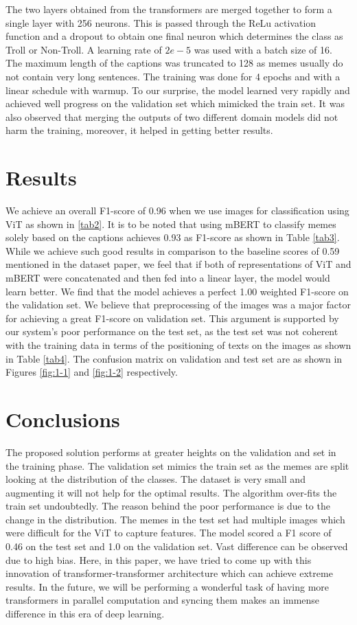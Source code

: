 \documentclass[11pt,a4paper]{article}
\begin{document}
 The two layers obtained from the transformers are merged together to form a single layer with 256 neurons. This is passed through the ReLu activation function and a dropout to obtain one final neuron which determines the class as Troll or Non-Troll. A learning rate of \(2e-5\) was used with a batch size of 16. The maximum length of the captions was truncated to 128 as memes usually do not contain very long sentences. The training was done for 4 epochs and with a linear schedule with warmup. To our surprise, the model learned very rapidly and achieved well progress on the validation set which mimicked the train set. It was also observed that merging the outputs of two different domain models did not harm the training, moreover, it helped in getting better results.
 

\section{Results}
\label{results}
We achieve an overall F1-score of 0.96 when we use images for classification using ViT as shown in \ref{tab2}. It is to be noted that using mBERT to classify memes solely based on the captions achieves 0.93 as F1-score as shown in Table \ref{tab3}. While we achieve such good results in comparison to the baseline scores of 0.59 mentioned in the dataset paper, we feel that if both of representations of ViT and mBERT were concatenated and then fed into a linear layer, the model would learn better. We find that the model achieves a perfect 1.00 weighted F1-score on the validation set. We believe that preprocessing of the images was a major factor for achieving a great F1-score on validation set. This argument is supported by our system's poor performance on the test set, as the test set was not coherent with the training data in terms of the positioning of texts on the images as shown in Table \ref{tab4}. The confusion matrix on validation and test set are as shown in Figures \ref{fig:1-1} and \ref{fig:1-2} respectively.
 

\section{Conclusions}
\label{conclusion}
The proposed solution performs at greater heights on the validation and set in the training phase. The validation set mimics the train set as the memes are split looking at the distribution of the classes. The dataset is very small and augmenting it will not help for the optimal results. The algorithm over-fits the train set undoubtedly. The reason behind the poor performance is due to the change in the distribution. The memes in the test set had multiple images which were difficult for the ViT to capture features. The model scored a F1 score of 0.46 on the test set and 1.0 on the validation set. Vast difference can be observed due to high bias. Here, in this paper, we have tried to come up with this innovation of transformer-transformer architecture which can achieve extreme results. In the future, we will be performing a wonderful task of having more transformers in parallel computation and syncing them makes an immense difference in this era of deep learning.      
\end{document}
